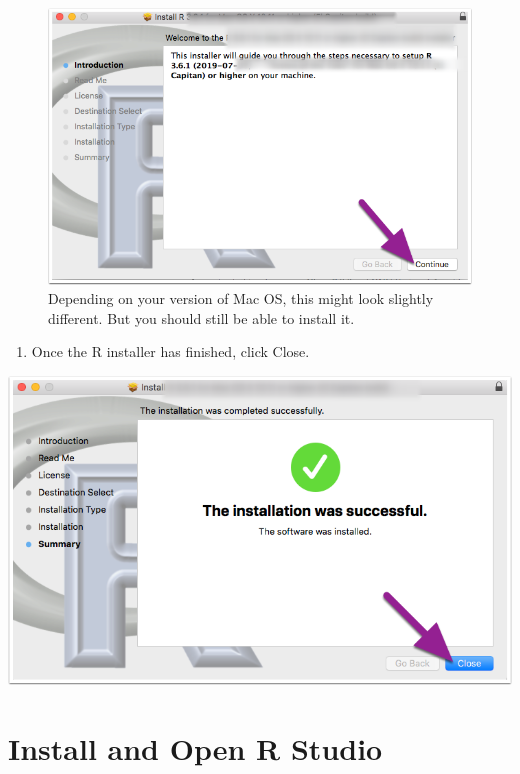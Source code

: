 \documentclass[
]{book}
\providecommand{\tightlist}{%
  \setlength{\itemsep}{0pt}\setlength{\parskip}{0pt}}
\begin{document}
\begin{figure}
\centering
\includegraphics{img/01-mac_installer.png}
\caption{\label{fig:unnamed-chunk-10}Depending on your version of Mac OS, this might look slightly different. But you should still be able to install it.}
\end{figure}

\begin{enumerate}
\def\labelenumi{\arabic{enumi}.}
\tightlist
\item
  Once the R installer has finished, click Close.
\end{enumerate}

\includegraphics{img/01-install_finish_mac.png}

\hypertarget{install-and-open-r-studio}{%
\section{Install and Open R Studio}\label{install-and-open-r-studio}}
\end{document}
